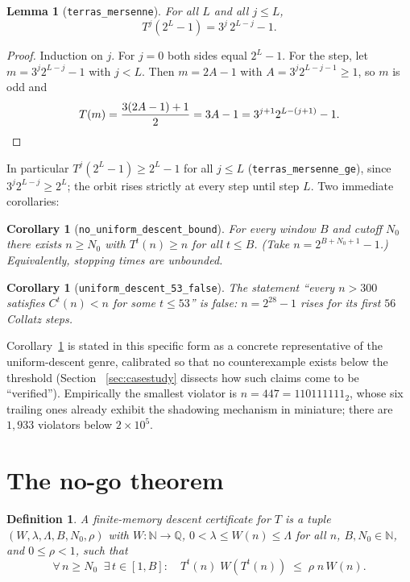 \documentclass[11pt]{article}
\newtheorem{lemma}[theorem]{Lemma}
\newtheorem{corollary}[theorem]{Corollary}
\newtheorem{definition}[theorem]{Definition}
\newcommand{\N}{\mathbb{N}}
\newcommand{\Q}{\mathbb{Q}}
\newcommand{\code}[1]{\texttt{#1}}
\begin{document}
\begin{lemma}[\code{terras\_mersenne}]\label{lem:shadow}
For all $L$ and all $j \le L$,
\[
T^j\!\left(2^L - 1\right) = 3^j\, 2^{L-j} - 1 .
\]
\end{lemma}

\begin{proof}
Induction on $j$. For $j = 0$ both sides equal $2^L - 1$. For the step,
let $m = 3^j 2^{L-j} - 1$ with $j < L$. Then $m = 2A - 1$ with
$A = 3^j 2^{L-j-1} \ge 1$, so $m$ is odd and
\[
T(m) = \frac{3(2A - 1) + 1}{2} = 3A - 1 = 3^{j+1} 2^{L-(j+1)} - 1.
\qedhere
\]
\end{proof}

In particular $T^j(2^L-1) \ge 2^L - 1$ for all $j \le L$
(\code{terras\_mersenne\_ge}), since $3^j 2^{L-j} \ge 2^L$; the orbit
rises strictly at every step until step $L$. Two immediate corollaries:

\begin{corollary}[\code{no\_uniform\_descent\_bound}]\label{cor:unbounded}
For every window $B$ and cutoff $N_0$ there exists $n \ge N_0$ with
$T^t(n) \ge n$ for all $t \le B$. (Take $n = 2^{B + N_0 + 1} - 1$.)
Equivalently, stopping times are unbounded.
\end{corollary}

\begin{corollary}[\code{uniform\_descent\_53\_false}]\label{cor:axiom}
The statement ``every $n > 300$ satisfies $C^t(n) < n$ for some
$t \le 53$'' is false: $n = 2^{28} - 1$ rises for its first $56$ Collatz
steps.
\end{corollary}

Corollary~\ref{cor:axiom} is stated in this specific form as a
concrete representative of the uniform-descent genre, calibrated so
that no counterexample exists below the threshold (Section~%
\ref{sec:casestudy} dissects how such claims come to be ``verified'').
Empirically the smallest violator is $n = 447 = 110111111_2$, whose six
trailing ones already exhibit the shadowing mechanism in miniature;
there are $1{,}933$ violators below $2 \times 10^5$.

\section{The no-go theorem}\label{sec:nogo}

\begin{definition}\label{def:cert}
A \emph{finite-memory descent certificate} for $T$ is a tuple
$(W, \lambda, \Lambda, B, N_0, \rho)$ with $W \colon \N \to \Q$,
$0 < \lambda \le W(n) \le \Lambda$ for all $n$, $B, N_0 \in \N$, and
$0 \le \rho < 1$, such that
\[
\forall\, n \ge N_0\;\; \exists\, t \in [1, B]:\quad
T^t(n)\; W\!\left(T^t(n)\right) \;\le\; \rho\; n\, W(n).
\]
\end{definition}
\end{document}
